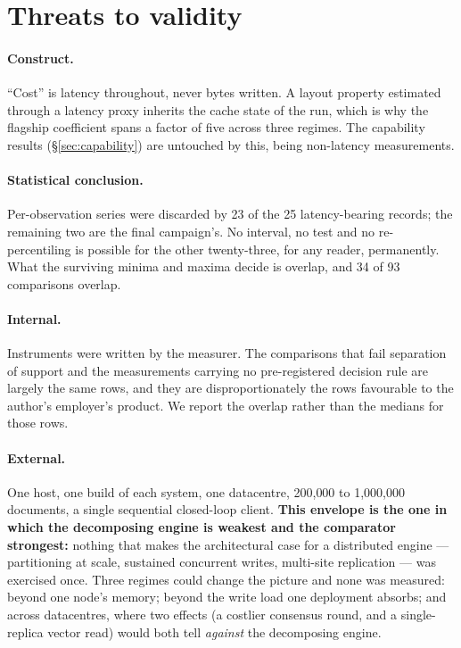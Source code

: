 \documentclass[11pt,a4paper]{article}
\begin{document}
\section{Threats to validity}
\label{sec:threats}

\paragraph{Construct.} ``Cost'' is latency throughout, never bytes written. A layout property
estimated through a latency proxy inherits the cache state of the run, which is why the flagship
coefficient spans a factor of five across three regimes. The capability results
(\S\ref{sec:capability}) are untouched by this, being non-latency measurements.

\paragraph{Statistical conclusion.} Per-observation series were discarded by 23 of the 25
latency-bearing records; the remaining two are the final campaign's. No interval, no test and no
re-percentiling is possible for the other twenty-three, for any reader, permanently. What the surviving minima and maxima decide is overlap, and 34 of 93 comparisons
overlap.

\paragraph{Internal.} Instruments were written by the measurer. The comparisons that fail separation
of support and the measurements carrying no pre-registered decision rule are largely the same rows,
and they are disproportionately the rows favourable to the author's employer's product. We report
the overlap rather than the medians for those rows.

\paragraph{External.} One host, one build of each system, one datacentre, 200{,}000 to 1{,}000{,}000
documents, a single sequential closed-loop client. \textbf{This envelope is the one in which the
decomposing engine is weakest and the comparator strongest:} nothing that makes the architectural
case for a distributed engine --- partitioning at scale, sustained concurrent writes, multi-site
replication --- was exercised once. Three regimes could change the picture and none was measured:
beyond one node's memory; beyond the write load one deployment absorbs; and across datacentres,
where two effects (a costlier consensus round, and a single-replica vector read) would both tell
\emph{against} the decomposing engine.
\end{document}
